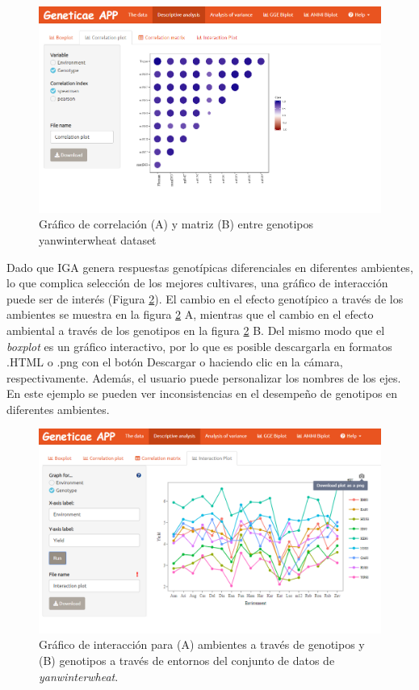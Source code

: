\begin{figure}[H]
	\begin{center}
		\includegraphics[width=16cm]{./Graficos/corr_gen.png}
	\end{center}
	\caption{Gráfico de correlación (A) y matriz (B) entre genotipos yanwinterwheat dataset }
	\label{fig:figdesc2}
\end{figure}


Dado que IGA genera respuestas genotípicas diferenciales en diferentes ambientes, lo que complica selección de los mejores cultivares, una gráfico de interacción puede ser de interés (Figura \ref{fig:figdesc4}). El cambio en el efecto genotípico a través de los ambientes se muestra en la figura \ref{fig:figdesc4} A, mientras que el cambio en el efecto ambiental a través de los genotipos en la figura \ref{fig:figdesc4} B. Del mismo modo que el \emph{boxplot} es un gráfico interactivo, por lo que es posible descargarla en formatos .HTML o .png con el botón Descargar o haciendo clic en la cámara, respectivamente. Además, el usuario puede personalizar los nombres de los ejes. En este ejemplo se pueden ver inconsistencias en el desempeño de genotipos en diferentes ambientes. 


\begin{figure}[H]
	\begin{center}
		\includegraphics[width=16cm]{./Graficos/int_plot.png}
	\end{center}
	\caption{Gráfico de interacción para (A) ambientes a través de genotipos y (B) genotipos a través de entornos del conjunto de datos de \emph{yanwinterwheat}.}
	\label{fig:figdesc4}
\end{figure}


